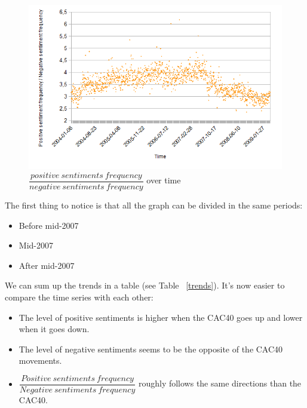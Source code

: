 \documentclass[12pt]{report}
\begin{document}
			\begin{figure}[h!]
				\caption{$\dfrac{positive\ sentiments\ frequency}{negative\ sentiments\ frequency}$ over time\label{posdivneg}}
				\includegraphics{plots/time/posdivneg.png}
			\end{figure}
			
			The first thing to notice is that all the graph can be divided in the same periods:
			\begin{itemize}
				\item Before mid-2007
				\item Mid-2007
				\item After mid-2007
			\end{itemize}

			 We can sum up the trends in a table (see Table ~\ref{trends}). It's now easier to compare the time series with each other:
			 \begin{itemize}
			 	\item The level of positive sentiments is higher when the CAC40 goes up and lower when it goes down.
			 	\item The level of negative sentiments seems to be the opposite of the CAC40 movements.
			 	\item $\dfrac{Positive\ sentiments\ frequency}{Negative\ sentiments\ frequency}$ roughly follows the same directions than the CAC40.
			 \end{itemize}
\end{document}
